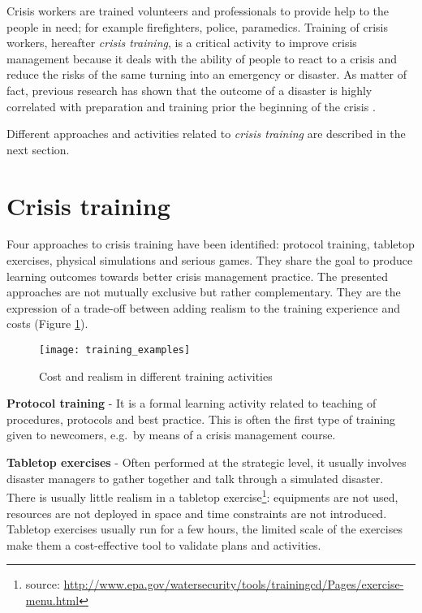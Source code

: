 Crisis workers are trained volunteers and professionals to provide help to the people in need; for example firefighters, police, paramedics. Training of crisis workers, hereafter \emph{crisis training}, is a critical activity to improve crisis management because it deals with the ability of people to react to a crisis and reduce the risks of the same turning into an emergency or disaster. As matter of fact, previous research has shown that the outcome of a disaster is highly correlated with preparation and training prior the beginning of the crisis \autocite{Asproth:cb}.

Different approaches and activities related to \emph{crisis training} are described in the next section.

\section{Crisis training}\label{crisis-training}

Four approaches to crisis training have been identified: protocol training, tabletop exercises, physical simulations and serious games. They share the goal to produce learning outcomes towards better crisis management practice. The presented approaches are not mutually exclusive but rather complementary. They are the expression of a trade-off between adding realism to the training experience and costs (Figure \ref{fig:training-activities}).

\begin{figure}
	[h!] \centering 
	\texttt{[image: training\_examples]} 
	\caption{Cost and realism in different training activities} 
	\label{fig:training-activities} 
\end{figure}

\textbf{Protocol training} - It is a formal learning activity related to teaching of procedures, protocols and best practice. This is often the first type of training given to newcomers, e.g.~by means of a crisis management course.

\textbf{Tabletop exercises} - Often performed at the strategic level, it usually involves disaster managers to gather together and talk through a simulated disaster. There is usually little realism in a tabletop exercise\footnote{source: \url{http://www.epa.gov/watersecurity/tools/trainingcd/Pages/exercise-menu.html}}: equipments are not used, resources are not deployed in space and time constraints are not introduced. Tabletop exercises usually run for a few hours, the limited scale of the exercises make them a cost-effective tool to validate plans and activities.

